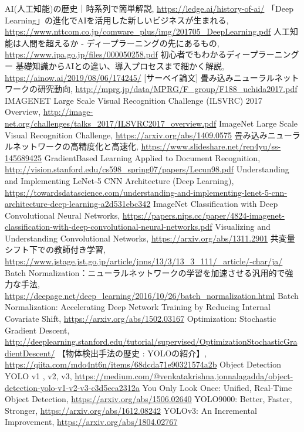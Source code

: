 \begin{thebibliography}{999}
	 AI(人工知能)の歴史｜時系列で簡単解説, \url{https://ledge.ai/history-of-ai/}
	 「Deep Learning」の進化でAIを活用した新しいビジネスが生まれる, \url{https://www.nttcom.co.jp/comware_plus/img/201705_DeepLearning.pdf}
	 人工知能は人間を超えるか - ディープラーニングの先にあるもの, \url{https://www.ipa.go.jp/files/000050258.pdf}
	 初心者でもわかるディープラーニング ー 基礎知識からAIとの違い、導入プロセスまで細かく解説, \url{https://ainow.ai/2019/08/06/174245/}
	 [サーベイ論文] 畳み込みニューラルネットワークの研究動向, \url{http://mprg.jp/data/MPRG/F_group/F188_uchida2017.pdf}
	 IMAGENET Large Scale Visual Recognition Challenge (ILSVRC) 2017 Overview, \url{http://image-net.org/challenges/talks_2017/ILSVRC2017_overview.pdf}
	 ImageNet Large Scale Visual Recognition Challenge, \url{https://arxiv.org/abs/1409.0575}
	 畳み込みニューラルネットワークの高精度化と高速化, \url{https://www.slideshare.net/ren4yu/ss-145689425}
	 GradientBased Learning Applied to Document Recognition, \url{http://vision.stanford.edu/cs598_spring07/papers/Lecun98.pdf}
	 Understanding and Implementing LeNet-5 CNN Architecture (Deep Learning), \url{https://towardsdatascience.com/understanding-and-implementing-lenet-5-cnn-architecture-deep-learning-a2d531ebc342}
	 ImageNet Classification with Deep Convolutional Neural Networks, \url{https://papers.nips.cc/paper/4824-imagenet-classification-with-deep-convolutional-neural-networks.pdf}
	 Visualizing and Understanding Convolutional Networks, \url{https://arxiv.org/abs/1311.2901}
	 共変量シフト下での教師付き学習, \url{https://www.jstage.jst.go.jp/article/jnns/13/3/13_3_111/_article/-char/ja/}
	 Batch Normalization：ニューラルネットワークの学習を加速させる汎用的で強力な手法, \url{https://deepage.net/deep_learning/2016/10/26/batch_normalization.html}
	 Batch Normalization: Accelerating Deep Network Training by Reducing Internal Covariate Shift, \url{https://arxiv.org/abs/1502.03167}
	 Optimization: Stochastic Gradient Descent, \url{http://deeplearning.stanford.edu/tutorial/supervised/OptimizationStochasticGradientDescent/}
	 【物体検出手法の歴史 : YOLOの紹介】, \url{https://qiita.com/mdo4nt6n/items/68dcda71e90321574a2b}
	 Object Detection YOLO v1 , v2, v3, \url{https://medium.com/@venkatakrishna.jonnalagadda/object-detection-yolo-v1-v2-v3-c3d5eca2312a}
	 You Only Look Once: Unified, Real-Time Object Detection, \url{https://arxiv.org/abs/1506.02640}
	 YOLO9000: Better, Faster, Stronger, \url{https://arxiv.org/abs/1612.08242}
	 YOLOv3: An Incremental Improvement, \url{https://arxiv.org/abs/1804.02767}
\end{thebibliography}
